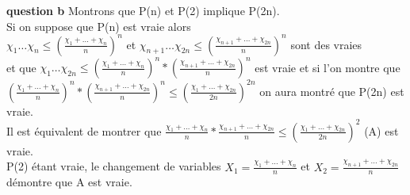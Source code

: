 \documentclass[9pt]{amsart}
\begin{document}
\noindent \textbf{question b}  Montrons que P(n) et P(2) implique P(2n). \\
Si on suppose que P(n) est vraie alors \\ $\chi_1\dots\chi_n \leq (\frac{\chi_1+\dots+\chi_n}{n})^n$ et 
$\chi_{n+1}\dots\chi_{2n} \leq (\frac{\chi_{n+1}+\dots+\chi_{2n}}{n})^n$ sont des vraies \\
et que $\chi_1\dots\chi_{2n} \leq (\frac{\chi_1+\dots+\chi_n}{n})^n * (\frac{\chi_{n+1}+\dots+\chi_{2n}}{n})^n$ est vraie et si l'on montre que \\
$(\frac{\chi_1+\dots+\chi_n}{n})^n * (\frac{\chi_{n+1}+\dots+\chi_{2n}}{n})^n \leq (\frac{\chi_1+\dots+\chi_{2n}}{2n})^{2n}$ on aura montré que P(2n) est vraie.\\ 
Il est équivalent de montrer que $\frac{\chi_1+\dots+\chi_n}{n} * \frac{\chi_{n+1}+\dots+\chi_{2n}}{n} \leq (\frac{\chi_1+\dots+\chi_{2n}}{2n})^{2}$ (A) est vraie. \\ 
P(2) étant vraie, le changement de variables $X_1 = \frac{\chi_1+\dots+\chi_n}{n}$ et $X_2 = \frac{\chi_{n+1}+\dots+\chi_{2n}}{n} $ démontre que A est vraie.
\end{document}
